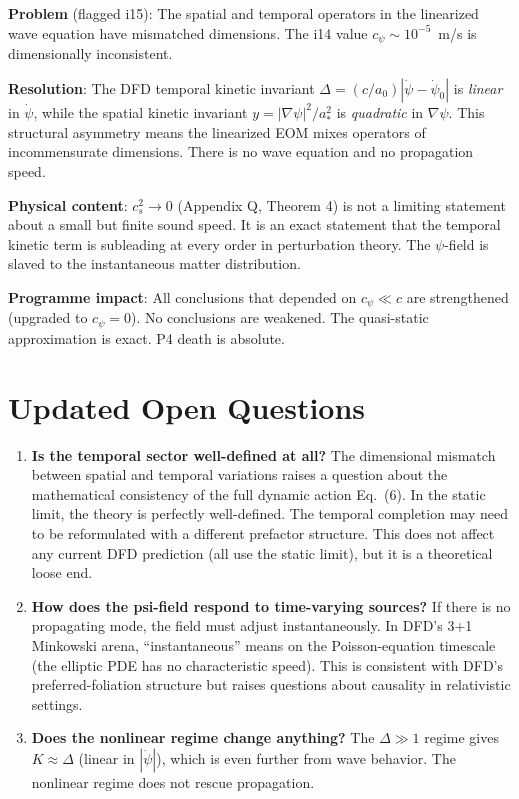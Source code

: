\documentclass[11pt]{article}
\begin{document}
\begin{tcolorbox}[colback=green!5!white, colframe=green!60!black,
  title=\textbf{c\_psi DIMENSIONAL AUDIT: RESOLVED}]

\textbf{Problem} (flagged i15): The spatial and temporal operators in the linearized wave equation have mismatched dimensions. The i14 value $c_\psi \sim 10^{-5}$~m/s is dimensionally inconsistent.

\textbf{Resolution}: The DFD temporal kinetic invariant $\Delta = (c/a_0)|\dot\psi - \dot\psi_0|$ is \emph{linear} in $\dot\psi$, while the spatial kinetic invariant $y = |\nabla\psi|^2/a_*^2$ is \emph{quadratic} in $\nabla\psi$. This structural asymmetry means the linearized EOM mixes operators of incommensurate dimensions. There is no wave equation and no propagation speed.

\textbf{Physical content}: $c_s^2 \to 0$ (Appendix Q, Theorem 4) is not a limiting statement about a small but finite sound speed. It is an exact statement that the temporal kinetic term is subleading at every order in perturbation theory. The $\psi$-field is slaved to the instantaneous matter distribution.

\textbf{Programme impact}: All conclusions that depended on $c_\psi \ll c$ are strengthened (upgraded to $c_\psi = 0$). No conclusions are weakened. The quasi-static approximation is exact. P4 death is absolute.
\end{tcolorbox}


\section{Updated Open Questions}

\begin{enumerate}
\item \textbf{Is the temporal sector well-defined at all?} The dimensional mismatch between spatial and temporal variations raises a question about the mathematical consistency of the full dynamic action Eq.~(6). In the static limit, the theory is perfectly well-defined. The temporal completion may need to be reformulated with a different prefactor structure. This does not affect any current DFD prediction (all use the static limit), but it is a theoretical loose end.

\item \textbf{How does the psi-field respond to time-varying sources?} If there is no propagating mode, the field must adjust instantaneously. In DFD's 3+1 Minkowski arena, ``instantaneous'' means on the Poisson-equation timescale (the elliptic PDE has no characteristic speed). This is consistent with DFD's preferred-foliation structure but raises questions about causality in relativistic settings.

\item \textbf{Does the nonlinear regime change anything?} The $\Delta \gg 1$ regime gives $K \approx \Delta$ (linear in $|\dot\psi|$), which is even further from wave behavior. The nonlinear regime does not rescue propagation.
\end{enumerate}
\end{document}
